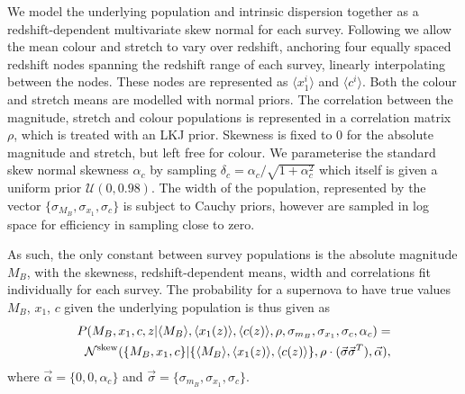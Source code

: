 \documentclass[a4paper,fleqn,usenatbib]{mnras}
\newcommand{\rubin}{\citetalias{Rubin2015}}
\begin{document}
We model the underlying population and intrinsic dispersion together as a redshift-dependent multivariate skew normal for each survey. Following {\rubin} we allow the mean colour and stretch to vary over redshift, anchoring four equally spaced redshift nodes spanning the redshift range of each survey, linearly interpolating between the nodes. These nodes are represented as $\langle x_1^i \rangle$ and $\langle c^i \rangle$. Both the colour and stretch means are modelled with normal priors. The correlation between the magnitude, stretch and colour populations is represented in a correlation matrix $\rho$, which is treated with an LKJ prior. Skewness is fixed to 0 for the absolute magnitude and stretch, but left free for colour. We parameterise the standard skew normal skewness $\alpha_c$ by sampling $\delta_c = \alpha_c / \sqrt{1 + \alpha_c^2}$ which itself is given a uniform prior $\mathcal{U}(0,0.98)$. The width of the population, represented by the vector $\lbrace \sigma_{M_B}, \sigma_{x_1}, \sigma_c \rbrace$ is subject to Cauchy priors, however are sampled in log space for efficiency in sampling close to zero. 

As such, the only constant between survey populations is the absolute magnitude $M_B$, with the skewness, redshift-dependent means, width and correlations fit individually for each survey. The probability for a supernova to have true values $M_B$, $x_1$, $c$ given the underlying population is thus given as
\begin{align}
P(M_B, x_1, c, z | \langle M_B \rangle, \langle x_1(z) \rangle, \langle c(z) \rangle, \rho, \sigma_{m_B}, \sigma_{x_1}, \sigma_c, \alpha_c) = \notag \\
\mathcal{N}^{\rm{skew}}(\lbrace M_B, x_1, c \rbrace | \lbrace \langle M_B \rangle, \langle x_1(z) \rangle, \langle c(z) \rangle \rbrace, \rho \cdot (\vec{\sigma} \vec{\sigma}^T), 
\vec{\alpha}) \label{eq:l1},
\end{align}
where $\vec{\alpha} = \lbrace 0, 0, \alpha_c \rbrace$ and $\vec{\sigma} = \lbrace \sigma_{m_B}, \sigma_{x_1}, \sigma_c \rbrace$.
\end{document}
